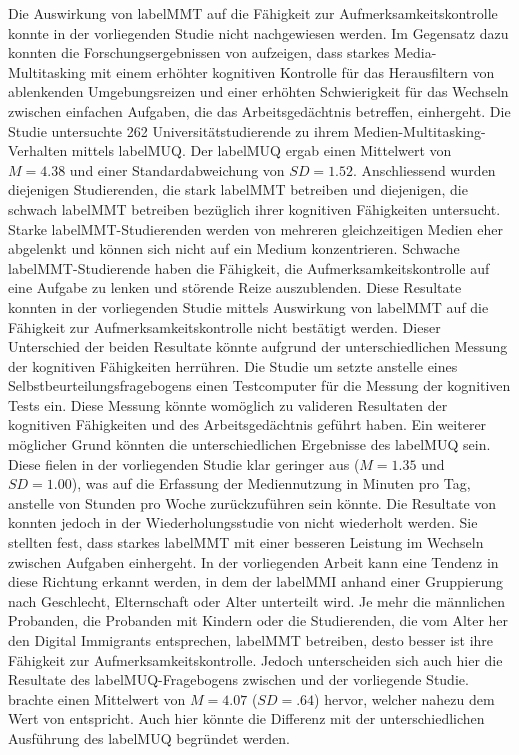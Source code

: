Die Auswirkung von \gls{labelMMT} auf die Fähigkeit zur Aufmerksamkeitskontrolle konnte in der vorliegenden Studie nicht nachgewiesen werden. Im Gegensatz dazu konnten die Forschungsergebnissen von  aufzeigen, dass starkes Media-Multitasking mit einem erhöhter kognitiven Kontrolle für das Herausfiltern von ablenkenden Umgebungsreizen und einer erhöhten Schwierigkeit für das Wechseln zwischen einfachen Aufgaben, die das Arbeitsgedächtnis betreffen, einhergeht. Die Studie untersuchte 262 Universitätstudierende zu ihrem Medien-Multitasking-Verhalten mittels \gls{labelMUQ}. Der \gls{labelMUQ} ergab einen Mittelwert von $M=4.38$ und einer Standardabweichung von $SD=1.52$. Anschliessend wurden diejenigen Studierenden, die stark \gls{labelMMT} betreiben und diejenigen, die schwach \gls{labelMMT} betreiben bezüglich ihrer kognitiven Fähigkeiten untersucht. Starke \gls{labelMMT}-Studierenden werden von mehreren gleichzeitigen Medien eher abgelenkt und können sich nicht auf ein Medium konzentrieren. Schwache \gls{labelMMT}-Studierende haben die Fähigkeit, die Aufmerksamkeitskontrolle auf eine Aufgabe zu lenken und störende Reize auszublenden. Diese Resultate konnten in der vorliegenden Studie mittels Auswirkung von \gls{labelMMT} auf die Fähigkeit zur Aufmerksamkeitskontrolle nicht bestätigt werden. Dieser Unterschied der beiden Resultate könnte aufgrund der unterschiedlichen Messung der kognitiven Fähigkeiten herrühren. Die Studie um  setzte anstelle eines Selbstbeurteilungsfragebogens einen Testcomputer für die Messung der kognitiven Tests ein. Diese Messung könnte womöglich zu valideren Resultaten der kognitiven Fähigkeiten und des Arbeitsgedächtnis geführt haben. Ein weiterer möglicher Grund könnten die unterschiedlichen Ergebnisse des \gls{labelMUQ} sein. Diese fielen in der vorliegenden Studie klar geringer aus ($M=1.35$ und $SD=1.00$), was auf die Erfassung der Mediennutzung in Minuten pro Tag, anstelle von Stunden pro Woche zurückzuführen sein könnte. Die Resultate von  konnten jedoch in der Wiederholungsstudie von  nicht wiederholt werden. Sie stellten fest, dass starkes \gls{labelMMT} mit einer besseren Leistung im Wechseln zwischen Aufgaben einhergeht. In der vorliegenden Arbeit kann eine Tendenz in diese Richtung erkannt werden, in dem der \gls{labelMMI} anhand einer Gruppierung nach Geschlecht, Elternschaft oder Alter unterteilt wird. Je mehr die männlichen Probanden, die Probanden mit Kindern oder die Studierenden, die vom Alter her den Digital Immigrants entsprechen, \gls{labelMMT} betreiben, desto besser ist ihre Fähigkeit zur Aufmerksamkeitskontrolle. Jedoch unterscheiden sich auch hier die Resultate des \gls{labelMUQ}-Fragebogens zwischen  und der vorliegende Studie. \citeauthor{Alzahabi2013} brachte einen Mittelwert von $M=4.07$ ($SD=.64$) hervor, welcher nahezu dem Wert von  entspricht. Auch hier könnte die Differenz mit der unterschiedlichen Ausführung des \gls{labelMUQ} begründet werden. 

